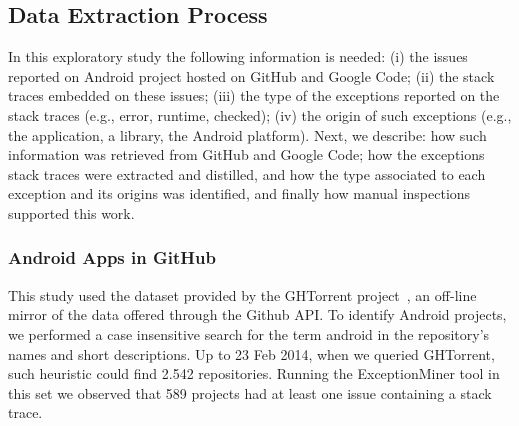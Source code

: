 \documentclass[conference]{IEEEtran}
\begin{document}
\subsection{Data Extraction Process}
\label{sec:miningproc}

In this exploratory study the following information is needed: (i) the issues reported on Android project hosted on 
GitHub and Google Code; (ii) the stack traces embedded on these issues; (iii) the type of the exceptions
 reported on the stack traces (e.g., error, runtime, checked); (iv) the origin of such exceptions 
(e.g., the application, a library, the Android platform). Next, we describe: how such information 
was retrieved from GitHub and Google Code; how the exceptions stack traces were extracted and distilled,
 and how the type associated to each exception and its origins was identified, and finally how manual
inspections supported this work.


\subsubsection{Android Apps in GitHub}
\label{sec:git}


This study used the dataset provided by the GHTorrent project~\cite{Gousi13}, 
an off-line mirror of the data  offered through the Github API.  
To identify Android projects, we performed a case insensitive search for the
term \textsf{android} in the repository's names and short descriptions.  
Up to 23 Feb 2014,  when we queried GHTorrent, such heuristic could
 find 2.542 repositories. Running the ExceptionMiner tool 
 in this set we observed that 589 projects had at least one issue containing a stack trace.
\end{document}
